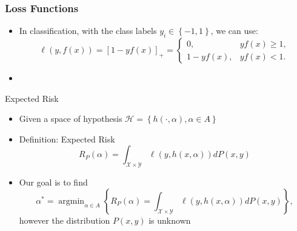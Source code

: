 \documentclass{beamer}
\DeclareMathOperator*{\argmin}{arg\min}
\newcommand{\pospart}[1]{\left[#1\right]_{+}}
\newcommand{\set}[1]{\left\{#1\right\}}
\newcommand{\hypf}{h}
\newcommand{\hyp}[2]{\hypf\left(#1, #2\right)}
\newcommand{\opt}[1]{{#1}^*}
\newcommand{\hypspace}{\mathcal{H}}
\newcommand{\param}{\alpha}
\newcommand{\paramspace}{A}
\newcommand{\lossf}{\ell}
\newcommand{\distf}{P}
\newcommand{\risk}{R}
\newcommand{\exprisk}{\risk_\distf}
\newcommand{\Xspace}{\mathcal{X}}
\newcommand{\Yspace}{\mathcal{Y}}
\begin{document}
\begin{frame}
      \frametitle{Loss Functions}

      \begin{itemize}
            \item In classification, with the class labels $y_i \in \set{-1, 1}$, we can use:
            \begin{equation}
                  \nonumber
                  \lossf(y, f(x)) = \pospart{1 - yf(x)} = 
                  \begin{cases}
                      0, & y f(x) \geq 1 ,\\
                      1 - y f(x), & y f(x) < 1 .
                  \end{cases}
            \end{equation}
            \item 
      \end{itemize}

\end{frame}


\begin{frame}
      {Expected Risk}
      \begin{itemize}
            \item Given a space of hypothesis $\hypspace = \set{\hyp{\cdot}{\param}, \param \in \paramspace}$
            \item Definition: Expected Risk
            \begin{equation}
                  \nonumber
                  \exprisk(\param) = \int_{\Xspace \times \Yspace} \ell(y, \hyp{x}{\param}) d\distf(x, y)
            \end{equation}
            \item Our goal is to find 
            \begin{equation}
                  \nonumber
                  \opt{\param} = \argmin_{\param \in \paramspace} \left\{ \exprisk(\param) = \int_{\Xspace \times \Yspace} \ell(y, \hyp{x}{\param}) d\distf(x, y) \right\} ,
              \end{equation}
            however the distribution $\distf(x, y)$ is unknown
      \end{itemize}
      
\end{frame}
\end{document}
